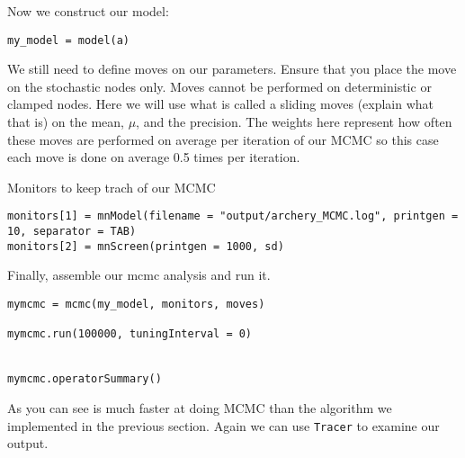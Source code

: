 Now we construct our model:

{\tt \begin{snugshade*}
 \begin{lstlisting}
my_model = model(a)
\end{lstlisting}
\end{snugshade*}}


We still need to define moves on our parameters. Ensure that you place the move on the stochastic nodes only. Moves cannot be performed on deterministic or clamped nodes. Here we will use what is called a sliding moves (explain what that is) on the mean, $\mu$, and the precision. The weights here represent how often these moves are performed on average per iteration of our MCMC so this case each move is done on average 0.5 times per iteration. 


Monitors to keep trach of our MCMC
{\tt \begin{snugshade*}
 \begin{lstlisting}
monitors[1] = mnModel(filename = "output/archery_MCMC.log", printgen = 10, separator = TAB)
monitors[2] = mnScreen(printgen = 1000, sd)

 \end{lstlisting}
\end{snugshade*}}

Finally, assemble our mcmc analysis and run it.

{\tt \begin{snugshade*}
 \begin{lstlisting}
mymcmc = mcmc(my_model, monitors, moves)

mymcmc.run(100000, tuningInterval = 0)


mymcmc.operatorSummary()
 \end{lstlisting}
\end{snugshade*}}

As you can see \RevBayes is much faster at doing MCMC than the algorithm we implemented in the previous section. Again we can use {\tt Tracer} to examine our output. 


